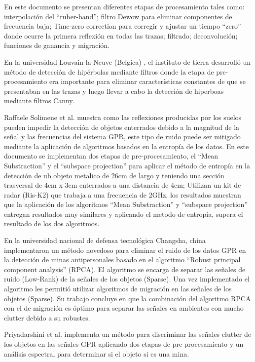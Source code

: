En este documento se presentan diferentes etapas de procesamiento tales como: interpolación del ``ruber-band''; filtro Dewow para eliminar componentes de frecuencia baja; Time-zero correction para corregir y ajustar un tiempo ``zero'' donde ocurre la primera reflexión en todas las trazas; filtrado; deconvolución; funciones de ganancia y migración.

En la universidad Louvain-la-Neuve (Belgica) , el instituto de tierra \cite{Detection_of_Reflection_Hyperbolas} desarrolló un método de detección de hipérbolas mediante filtros  donde la etapa de pre-procesamiento era importante para eliminar características constantes de que se presentaban en las trazas y luego llevar a cabo la detección de hiperboas mediante filtros Canny.

Raffaele Solimene et al. \cite{Ground_Clutter_Removal_in_GPR_Surveys} muestra como las reflexiones producidas por los suelos pueden impedir la detección de objetos enterrados debido a la magnitud de la señal y las frecuencias del sistema GPR, este tipo de ruido puede ser mitigado mediante la aplicación de algoritmos  basados en la entropía de los datos. En este documento se implementan dos etapas de pre-procesamiento, el ``Mean Substraction'' y el ``subspace projection'' para aplicar el método de entropía en la detección de ub objeto metalico de 26cm de largo y teniendo una sección trasversal de 4cm x 3cm enterrados a una distancia de 4cm; Utilizan un kit de radar (Ris-K2) que trabaja a una frecuencia de 2GHz, los resultados muestran que la aplicación de los algoritmos ``Mean Substraction'' y  ``subspace projection''  entregan resultados muy similares  y aplicando el metodo de entropia, supera el resultado de los dos algoritmos.

En la universidad nacional de defensa tecnológica Changsha, china \cite{Improving_RPCA-Based_Clutter_Suppression} implementaron un método novedoso para eliminar el ruido de los datos GPR en la detección de minas antipersonales basado en el algoritmo  ``Robust principal component analysis'' (RPCA). El algoritmo se encarga de separar las señales de ruido (Low-Rank) de la señales de los objetos (Sparse). Una vez implementado el algoritmo les permitió utilizar algoritmos de migración en las señales de los objetos (Sparse). Su trabajo concluye en que la combinación del algoritmo RPCA con el de migración es óptimo para separar las señales en ambientes con mucho clutter debido a su robustes.

Priyadarshini et al. \cite{Buried-Discrimination-gpr-Radar-Radargram} implementa un método para discriminar las señales clutter de los objetos en las señales GPR aplicando dos etapas de pre procesamiento y un análisis espectral para determinar si el objeto si es una mina.

